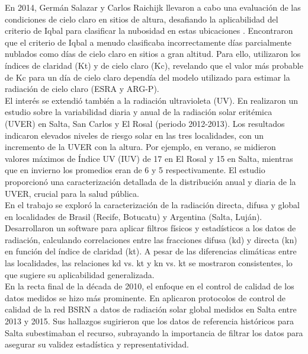 En 2014, Germán Salazar y Carlos Raichijk llevaron a cabo una evaluación de las condiciones de cielo claro en sitios de altura, desafiando la aplicabilidad del criterio de Iqbal para clasificar la nubosidad en estas ubicaciones \cite{Salazar2014}. Encontraron que el criterio de Iqbal a menudo clasificaba incorrectamente días parcialmente nublados como días de cielo claro en sitios a gran altitud. Para ello, utilizaron los índices de claridad (Kt) y de cielo claro (Kc), revelando que el valor más probable de Kc para un día de cielo claro dependía del modelo utilizado para estimar la radiación de cielo claro (ESRA y ARG-P).\\

El interés se extendió también a la radiación ultravioleta (UV). En \cite{Suazarez2014} realizaron un estudio sobre la variabilidad diaria y anual de la radiación solar eritémica (UVER) en Salta, San Carlos y El Rosal (periodo 2012-2013). Los resultados indicaron elevados niveles de riesgo solar en las tres localidades, con un incremento de la UVER con la altura. Por ejemplo, en verano, se midieron valores máximos de Índice UV (IUV) de 17 en El Rosal y 15 en Salta, mientras que en invierno los promedios eran de 6 y 5 respectivamente. El estudio proporcionó una caracterización detallada de la distribución anual y diaria de la UVER, crucial para la salud pública.\\

En el trabajo \cite{Vilela2015} se exploró la caracterización de la radiación directa, difusa y global en localidades de Brasil (Recife, Botucatu) y Argentina (Salta, Luján). Desarrollaron un software para aplicar filtros físicos y estadísticos a los datos de radiación, calculando correlaciones entre las fracciones difusa (kd) y directa (kn) en función del índice de claridad (kt). A pesar de las diferencias climáticas entre las localidades, las relaciones kd vs. kt y kn vs. kt se mostraron consistentes, lo que sugiere su aplicabilidad generalizada.\\

En la recta final de la década de 2010, el enfoque en el control de calidad de los datos medidos se hizo más prominente. En \cite{RomanoArmada2017} aplicaron protocolos de control de calidad de la red BSRN a datos de radiación solar global medidos en Salta entre 2013 y 2015. Sus hallazgos sugirieron que los datos de referencia históricos para Salta subestimaban el recurso, subrayando la importancia de filtrar los datos para asegurar su validez estadística y representatividad.\\

